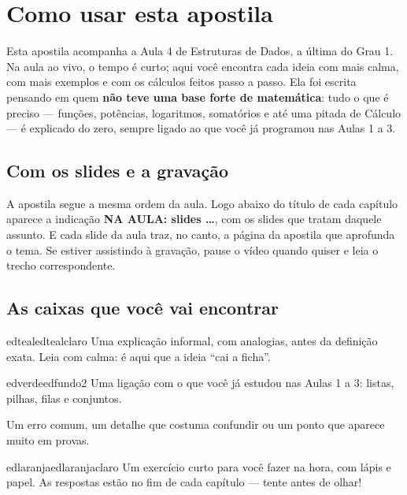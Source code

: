 \documentclass[11pt]{report}
\newenvironment{intuicao}{\begin{caixa}[Intuição]{edteal}{edtealclaro}}{\end{caixa}}
\newenvironment{conexao}{\begin{caixa}[Conexão com as aulas anteriores]{edverde}{edfundo2}}{\end{caixa}}
\begin{document}
\chapter*{Como usar esta apostila}\label{cap:como}

Esta apostila acompanha a Aula 4 de Estruturas de Dados, a última do Grau 1. Na aula ao vivo, o
tempo é curto; aqui você encontra cada ideia com mais calma, com mais exemplos e com os
cálculos feitos passo a passo. Ela foi escrita pensando em quem \textbf{não teve uma base forte
de matemática}: tudo o que é preciso — funções, potências, logaritmos, somatórios e até uma
pitada de Cálculo — é explicado do zero, sempre ligado ao que você já programou nas Aulas 1 a 3.

\section*{Com os slides e a gravação}

A apostila segue a mesma ordem da aula. Logo abaixo do título de cada capítulo aparece a
indicação \textbf{NA AULA: slides \dots}, com os slides que tratam daquele assunto. E cada slide
da aula traz, no canto, a página da apostila que aprofunda o tema. Se estiver assistindo à
gravação, pause o vídeo quando quiser e leia o trecho correspondente.

\section*{As caixas que você vai encontrar}

\begin{intuicao}
Uma explicação informal, com analogias, antes da definição exata. Leia com calma: é aqui que a
ideia \enquote{cai a ficha}.
\end{intuicao}

\begin{conexao}
Uma ligação com o que você já estudou nas Aulas 1 a 3: listas, pilhas, filas e conjuntos.
\end{conexao}

\begin{atencao}
Um erro comum, um detalhe que costuma confundir ou um ponto que aparece muito em provas.
\end{atencao}

\begin{caixa}{edlaranja}{edlaranjaclaro}
Um exercício curto para você fazer na hora, com lápis e papel. As respostas estão no fim de
cada capítulo — tente antes de olhar!
\end{caixa}
\end{document}
